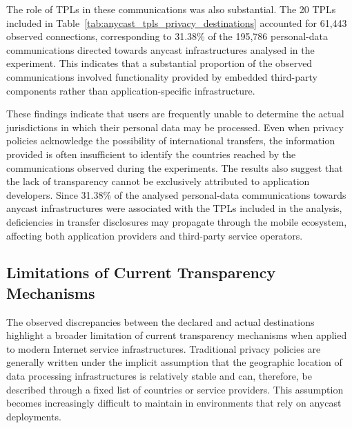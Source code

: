 The role of TPLs in these communications was also substantial. The 20 TPLs included in Table~\ref{tab:anycast_tpls_privacy_destinations} accounted for 61,443 observed connections, corresponding to 31.38\% of the 195,786 personal-data communications directed towards anycast infrastructures analysed in the experiment. This indicates that a substantial proportion of the observed communications involved functionality provided by embedded third-party components rather than application-specific infrastructure.

These findings indicate that users are frequently unable to determine the actual jurisdictions in which their personal data may be processed. Even when privacy policies acknowledge the possibility of international transfers, the information provided is often insufficient to identify the countries reached by the communications observed during the experiments. The results also suggest that the lack of transparency cannot be exclusively attributed to application developers. Since 31.38\% of the analysed personal-data communications towards anycast infrastructures were associated with the TPLs included in the analysis, deficiencies in transfer disclosures may propagate through the mobile ecosystem, affecting both application providers and third-party service operators.

\subsection{Limitations of Current Transparency Mechanisms}
\label{sc:anycast_experiments_transparency_limitations}

The observed discrepancies between the declared and actual destinations highlight a broader limitation of current transparency mechanisms when applied to modern Internet service infrastructures. Traditional privacy policies are generally written under the implicit assumption that the geographic location of data processing infrastructures is relatively stable and can, therefore, be described through a fixed list of countries or service providers. This assumption becomes increasingly difficult to maintain in environments that rely on anycast deployments.

